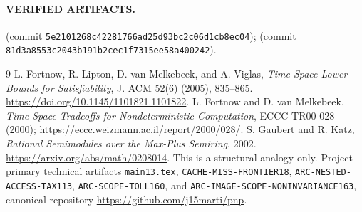 \documentclass[11pt]{article}
\begin{document}
\paragraph{VERIFIED ARTIFACTS.}
(commit \texttt{5e2101268c42281766ad25d93bc2c06d1cb8ec04});
(commit \texttt{81d3a8553c2043b191b2cec1f7315ee58a400242}).

\begin{thebibliography}{9}
 L. Fortnow, R. Lipton, D. van Melkebeek,
and A. Viglas, \emph{Time-Space Lower Bounds for Satisfiability},
J. ACM 52(6) (2005), 835--865.
\url{https://doi.org/10.1145/1101821.1101822}.
 L. Fortnow and D. van Melkebeek,
\emph{Time-Space Tradeoffs for Nondeterministic Computation},
ECCC TR00-028 (2000);
\url{https://eccc.weizmann.ac.il/report/2000/028/}.
 S. Gaubert and R. Katz,
\emph{Rational Semimodules over the Max-Plus Semiring},
2002. \url{https://arxiv.org/abs/math/0208014}.
This is a structural analogy only.
 Project primary technical artifacts
\texttt{main13.tex}, \texttt{CACHE-MISS-FRONTIER18},
\texttt{ARC-NESTED-ACCESS-TAX113},
\texttt{ARC-SCOPE-TOLL160}, and
\texttt{ARC-IMAGE-SCOPE-NONINVARIANCE163},
canonical repository \url{https://github.com/j15marti/pnp}.
\end{thebibliography}
\end{document}
